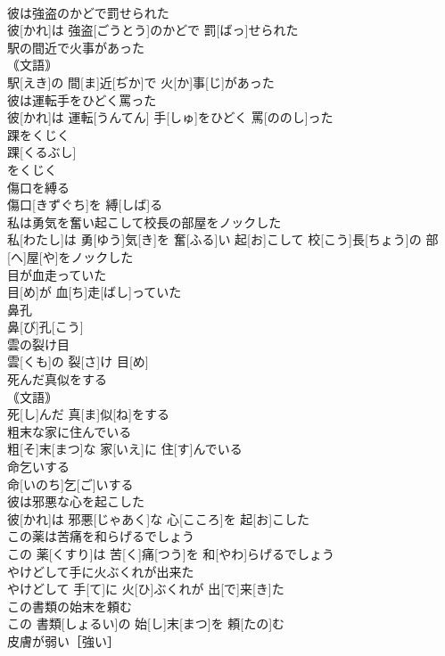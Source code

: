 \documentclass[8pt]{extreport}
\begin{document}
\begin{CJK}{UTF8}{min}
\\	彼は強盗のかどで罰せられた	
\\	彼[かれ]は 強盗[ごうとう]のかどで 罰[ばっ]せられた
\\	駅の間近で火事があった	
\\	｟文語｠
\\	駅[えき]の 間[ま]近[ぢか]で 火[か]事[じ]があった
\\	彼は運転手をひどく罵った	
\\	彼[かれ]は 運転[うんてん] 手[しゅ]をひどく 罵[ののし]った
\\	踝をくじく	
\\	踝[くるぶし]
\\	をくじく 
\\	傷口を縛る	
\\	傷口[きずぐち]を 縛[しば]る
\\	私は勇気を奮い起こして校長の部屋をノックした	
\\	私[わたし]は 勇[ゆう]気[き]を 奮[ふる]い 起[お]こして 校[こう]長[ちょう]の 部[へ]屋[や]をノックした
\\	目が血走っていた	
\\	目[め]が 血[ち]走[ばし]っていた
\\	鼻孔	
\\	鼻[び]孔[こう]
\\	雲の裂け目	
\\	雲[くも]の 裂[さ]け 目[め]
\\	死んだ真似をする	
\\	｟文語｠
\\	死[し]んだ 真[ま]似[ね]をする
\\	粗末な家に住んでいる	
\\	粗[そ]末[まつ]な 家[いえ]に 住[す]んでいる
\\	命乞いする	
\\	命[いのち]乞[ご]いする
\\	彼は邪悪な心を起こした	
\\	彼[かれ]は 邪悪[じゃあく]な 心[こころ]を 起[お]こした
\\	この薬は苦痛を和らげるでしょう	
\\	この 薬[くすり]は 苦[く]痛[つう]を 和[やわ]らげるでしょう
\\	やけどして手に火ぶくれが出来た	
\\	やけどして 手[て]に 火[ひ]ぶくれが 出[で]来[き]た
\\	この書類の始末を頼む	
\\	この 書類[しょるい]の 始[し]末[まつ]を 頼[たの]む
\\	皮膚が弱い［強い］	

\end{CJK}
\end{document}
